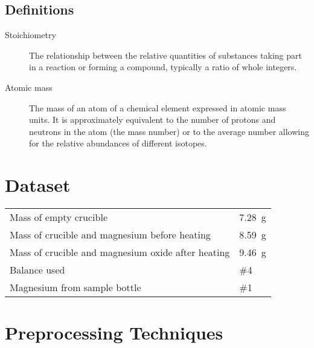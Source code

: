 \documentclass[
	letterpaper, %
	10pt, %
]{class}
\begin{document}
\subsection{Definitions}\label{definitions} %

\begin{description}
	\item[Stoichiometry] The relationship between the relative quantities of substances taking part in a reaction or forming a compound, typically a ratio of whole integers.
	\item[Atomic mass] The mass of an atom of a chemical element expressed in atomic mass units. It is approximately equivalent to the number of protons and neutrons in the atom (the mass number) or to the average number allowing for the relative abundances of different isotopes.
\end{description}


\section{Dataset}

\begin{tabular}{l l}
	Mass of empty crucible                             & \SI{7.28}{\gram} \\ %
	Mass of crucible and magnesium before heating      & \SI{8.59}{\gram} \\
	Mass of crucible and magnesium oxide after heating & \SI{9.46}{\gram} \\
	Balance used                                       & \#4              \\
	Magnesium from sample bottle                       & \#1
\end{tabular}


\section{Preprocessing Techniques}
\end{document}
